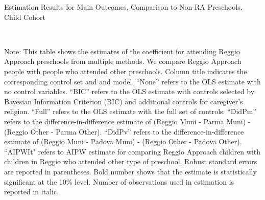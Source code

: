 

\begin{table}[H] \caption{Estimation Results for Main Outcomes, Comparison to Non-RA Preschools, Child Cohort} \label{ols-M-child-reg-pres}
\scalebox{0.8}{}
\vspace{1ex} \\
\footnotesize\raggedright{Note: This table shows the estimates of the coefficient for attending Reggio Approach preschools from multiple methods. We compare Reggio Approach people with people who attended other preschools. Column title indicates the corresponding control set and and model. ``None'' refers to the OLS estimate with no control variables. ``BIC'' refers to the OLS estimate with controls selected by Bayesian Information Criterion (BIC) and additional controls for caregiver's religion. ``Full'' refers to the OLS estimate with the full set of controls. ``DidPm'' refers to the difference-in-difference estimate of (Reggio Muni - Parma Muni) - (Reggio Other - Parma Other). ``DidPv'' refers to the difference-in-difference estimate of (Reggio Muni - Padova Muni) - (Reggio Other - Padova Other). ``AIPWIt" refers to AIPW estimate for comparing Reggio Approach children with children in Reggio who attended other type of preschool. Robust standard errors are reported in parentheses. Bold number shows that the estimate is statistically significant at the 10\% level. Number of observations used in estimation is reported in italic.}

\end{table}


